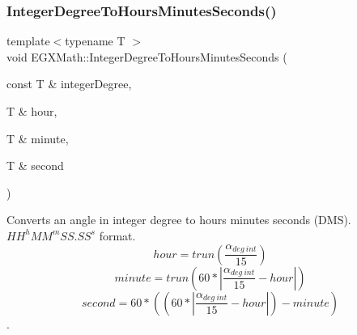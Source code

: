 \mbox{\label{group___e_g_x_math-_angle_conversions-_integer_degree_gaaac96728b305fd8ed024843f4e92fd08}} 
\subsubsection{\texorpdfstring{Integer\+Degree\+To\+Hours\+Minutes\+Seconds()}{IntegerDegreeToHoursMinutesSeconds()}}
{\footnotesize\ttfamily template$<$typename T $>$ \\
void E\+G\+X\+Math\+::\+Integer\+Degree\+To\+Hours\+Minutes\+Seconds (\begin{DoxyParamCaption}\item[{const T \&}]{integer\+Degree,  }\item[{T \&}]{hour,  }\item[{T \&}]{minute,  }\item[{T \&}]{second }\end{DoxyParamCaption})}



Converts an angle in integer degree to hours minutes seconds (D\+MS). ${HH}^{h}{MM}^{m}{SS.SS}^{s}$ format. \[hour=trun(\frac{\alpha_{deg\ int}}{15})\] \[minute=trun(60 * |\frac{\alpha_{deg\ int}}{15} - hour|)\] \[second=60 * ((60 * |\frac{\alpha_{deg\ int}}{15} - hour|)-minute)\]. 

